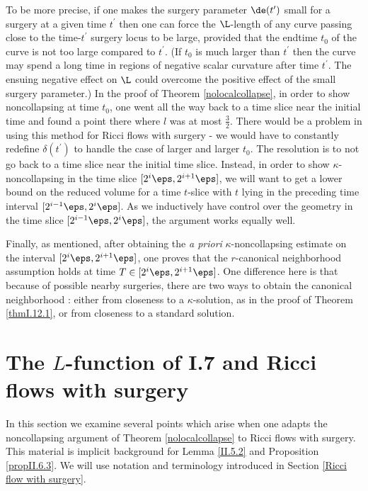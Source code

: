 To be more precise, if one makes the surgery parameter $\de(t^\prime)$ small
for a surgery at a given time $t^\prime$ then one can force the $\L$-length of
any curve passing close to the time-$t^\prime$ surgery locus to be large, provided that the
endtime $t_0$ of the curve is not too large compared to $t^\prime$.
(If $t_0$ is much larger than $t^\prime$ then the curve may spend a long time
in regions of negative scalar curvature after time $t^\prime$. The ensuing negative
effect on $\L$ could overcome the
positive effect of the small surgery parameter.)
In the proof of Theorem
\ref{nolocalcollapse}, in order to show noncollapsing at time $t_0$, one went all
the way back to a time slice near the initial time and found a point there where
$l$ was at most $\frac32$. There would be a problem in using this method
for Ricci flows with surgery - we would have to constantly redefine $\delta(t^\prime)$
to handle the case of larger and larger $t_0$. The resolution is to not go back to
a time slice
near the initial time slice. Instead, in order to
show $\kappa$-noncollapsing in the time slice
$[2^i \eps, 2^{i+1} \eps]$, we will want to get a lower bound on the
reduced volume for
a time $t$-slice with $t$ lying in the preceding time interval
$[2^{i-1}\eps,2^i\eps]$.   As we inductively have control over the geometry
in the time slice $[2^{i-1}\eps,2^i\eps]$, the argument works equally well.

Finally, as mentioned, after obtaining the {\it a priori} $\kappa$-noncollapsing
estimate on the interval $[2^{i}\eps,2^{i+1}\eps]$, one proves that the
$r$-canonical neighborhood assumption holds at time
$T \in [2^{i}\eps,2^{i+1}\eps]$. One difference here is
that because of possible nearby surgeries, there are two ways
to obtain the canonical neighborhood : either from closeness to
a $\kappa$-solution, as in the proof of
Theorem \ref{thmI.12.1}, or from closeness to a standard
solution.



\section{The $L$-function  of I.7 and Ricci flows with surgery}
\label{lfunctionandsurgerysection}


In this section we examine several points which arise when one adapts
the noncollapsing argument of Theorem \ref{nolocalcollapse} to Ricci flows with surgery.
This material is implicit background for
Lemma \ref{II.5.2} and Proposition \ref{propII.6.3}.  We will use notation
and terminology introduced in Section \ref{Ricci flow with surgery}.

